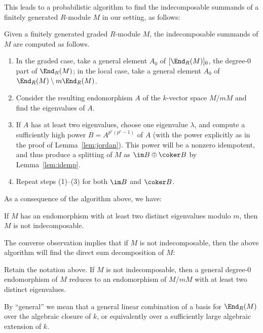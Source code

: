 \documentclass[12pt]{article}
\let\l\lambda
\numberwithin{equation}{section}
\theoremstyle{theorem}
\numberwithin{thm}{section}
\theoremstyle{definition}
\begin{document}
This leads to a probabilistic algorithm to find the indecomposable summands of a finitely generated $R$-module $M$ in our setting, as follows:

\begin{alg} Given a finitely generated graded $R$-module $M$, the indecomposable summands of $M$ are computed as follows.
  \begin{enumerate}
  \item \label{1} In the graded case, take a general element $A_0$ of $[\End_R(M)]_0$, the degree-0 part of $\End_R(M)$; in the local case, take a general element $A_0$ of $\End_R(M) \setminus m \End_R(M)$.
  \item Consider the resulting endomorphism $A$ of the $k$-vector space $M/mM$ and find the eigenvalues of $A$.
  \item If $A$ has at least two eigenvalues, choose one eigenvalue $\l$, and compute a sufficiently high power $B=A^{p^e(p^{e}-1)}$ of $A$ (with the power explicitly as in the proof of Lemma~\ref{lem:jordan}). This power will be a nonzero idempotent, and thus produce a splitting of $M$ as $\im B \oplus \coker B$ by Lemma~\ref{lem:idemp}.
  \item Repeat steps (1)--(3) for both $\im B$ and $\coker B$.
  \end{enumerate}
\end{alg}

As a consequence of the algorithm above, we have:

\begin{lem}
If $M$ has an endomorphism with at least two distinct eigenvalues modulo $m$, then $M$ is not indecomposable.
\end{lem}

The converse observation implies that if $M$ is not indecomposable, then the above algorithm will find the direct sum decomposition of $M$:

\begin{lem}
Retain the notation above.
  If $M$ is not indecomposable, then a general degree-0 endomorphism of $M$ reduces to an endomorphism of $M/mM$ with at least two distinct eigenvalues.
\end{lem}

\begin{rem}
  By ``general'' we mean that a general linear combination of a basis for $\End_R(M)$ over the algebraic closure of $k$, or equivalently over a sufficiently large algebraic extension of $k$.
\end{rem}
\end{document}
